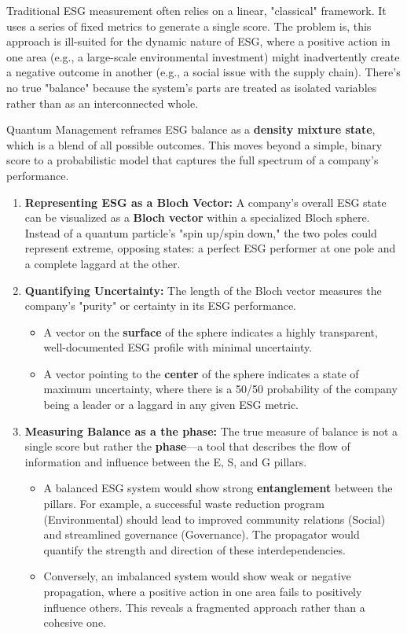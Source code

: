 \documentclass{article}
\begin{document}
Traditional ESG measurement often relies on a linear, "classical" framework. It uses a series of fixed metrics to generate a single score. The problem is, this approach is ill-suited for the dynamic nature of ESG, where a positive action in one area (e.g., a large-scale environmental investment) might inadvertently create a negative outcome in another (e.g., a social issue with the supply chain). There's no true "balance" because the system's parts are treated as isolated variables rather than as an interconnected whole.

Quantum Management reframes ESG balance as a \textbf{density mixture state}, which is a blend of all possible outcomes. This moves beyond a simple, binary score to a probabilistic model that captures the full spectrum of a company's performance.

\begin{enumerate}
    \item \textbf{Representing ESG as a Bloch Vector:} A company's overall ESG state can be visualized as a \textbf{Bloch vector} within a specialized Bloch sphere. Instead of a quantum particle's "spin up/spin down," the two poles could represent extreme, opposing states: a perfect ESG performer at one pole and a complete laggard at the other.
    \item \textbf{Quantifying Uncertainty:} The length of the Bloch vector measures the company's "purity" or certainty in its ESG performance.
    \begin{itemize}
        \item A vector on the \textbf{surface} of the sphere indicates a highly transparent, well-documented ESG profile with minimal uncertainty.
        \item A vector pointing to the \textbf{center} of the sphere indicates a state of maximum uncertainty, where there is a 50/50 probability of the company being a leader or a laggard in any given ESG metric.
    \end{itemize}
    \item \textbf{Measuring Balance as a the phase:} The true measure of balance is not a single score but rather the \textbf{phase}---a tool that describes the flow of information and influence between the E, S, and G pillars.
    \begin{itemize}
        \item A balanced ESG system would show strong \textbf{entanglement} between the pillars. For example, a successful waste reduction program (Environmental) should lead to improved community relations (Social) and streamlined governance (Governance). The propagator would quantify the strength and direction of these interdependencies.
        \item Conversely, an imbalanced system would show weak or negative propagation, where a positive action in one area fails to positively influence others. This reveals a fragmented approach rather than a cohesive one.
    \end{itemize}
\end{enumerate}
\end{document}
